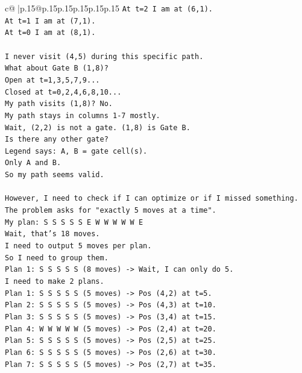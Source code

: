 \documentclass{article}
\begin{document}
{\begin{supertabular}{c@{$\;$}|p{.15\linewidth}@{}p{.15\linewidth}p{.15\linewidth}p{.15\linewidth}p{.15\linewidth}p{.15\linewidth}}
{{{\texttt{At t=2 I am at (6,1).} \\
\texttt{At t=1 I am at (7,1).} \\
\texttt{At t=0 I am at (8,1).} \\
\\ 
\texttt{I never visit (4,5) during this specific path.} \\
\texttt{What about Gate B (1,8)?} \\
\texttt{Open at t=1,3,5,7,9...} \\
\texttt{Closed at t=0,2,4,6,8,10...} \\
\texttt{My path visits (1,8)? No.} \\
\texttt{My path stays in columns 1{-}7 mostly.} \\
\texttt{Wait, (2,2) is not a gate. (1,8) is Gate B.} \\
\texttt{Is there any other gate?} \\
\texttt{Legend says: A, B = gate cell(s).} \\
\texttt{Only A and B.} \\
\texttt{So my path seems valid.} \\
\\ 
\texttt{However, I need to check if I can optimize or if I missed something.} \\
\texttt{The problem asks for "exactly 5 moves at a time".} \\
\texttt{My plan: S S S S S E W W W W W E} \\
\texttt{Wait, that's 18 moves.} \\
\texttt{I need to output 5 moves per plan.} \\
\texttt{So I need to group them.} \\
\texttt{Plan 1: S S S S S (8 moves) {-}> Wait, I can only do 5.} \\
\texttt{I need to make 2 plans.} \\
\texttt{Plan 1: S S S S S (5 moves) {-}> Pos (4,2) at t=5.} \\
\texttt{Plan 2: S S S S S (5 moves) {-}> Pos (4,3) at t=10.} \\
\texttt{Plan 3: S S S S S (5 moves) {-}> Pos (3,4) at t=15.} \\
\texttt{Plan 4: W W W W W (5 moves) {-}> Pos (2,4) at t=20.} \\
\texttt{Plan 5: S S S S S (5 moves) {-}> Pos (2,5) at t=25.} \\
\texttt{Plan 6: S S S S S (5 moves) {-}> Pos (2,6) at t=30.} \\
\texttt{Plan 7: S S S S S (5 moves) {-}> Pos (2,7) at t=35.} \\
}}}
\end{supertabular}}
\end{document}
